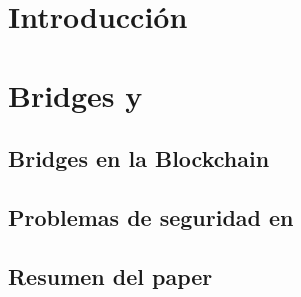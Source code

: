 \documentclass[11pt,a4paper,twoside]{tesis}
\begin{document}

\def\autor{Lorenzo Ruiz Díaz}
\def\tituloTesis{Un \zkBridge para \Cardano\\[0.25cm] utilizando pruebas de conocimiento cero}
\def\runtitulo{Desarrollo de un \zkBridge en Cardano}
\def\runtitle{Development of a \zkBridge in Cardano}
\def\director{Matías López y Rosenfeld}
\def\codirector{Bruno Weisz}
\def\lugar{Buenos Aires, 2026}


\frontmatter
\pagestyle{empty}


\cleardoublepage

\cleardoublepage

\cleardoublepage

\cleardoublepage
\tableofcontents

\cleardoublepage


\mainmatter
\pagestyle{headings}


\chapter{Introducción}
\label{chap:introduccion}



\chapter{Bridges y \zkBridge}
\label{chap:bridges-y-zkbridge}
\section{Bridges en la Blockchain}
\label{sec:bridges-y-zkbridge-bridges-en-la-blockchain}



\section{Problemas de seguridad en \Bridges}
\label{sec:bridges-y-zkbridge-problemas-de-seguridad-en-bridges}



\section{Resumen del paper \zkBridge}
\label{sec:bridges-y-zkbridge-resumen-del-paper-zkbridge}
\end{document}
